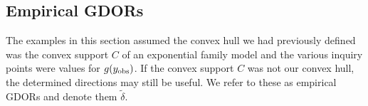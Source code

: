 
\subsection{Empirical GDORs}
The examples in this section assumed the convex hull we had previously defined was
the convex support $C$ of an exponential family model and the various 
inquiry points were values for $g(y_{\text{obs}})$.
If the convex support $C$ was not our convex hull, the determined directions may
 still be useful.  We refer to these as empirical GDORs and denote them $\tilde{\delta}$.


